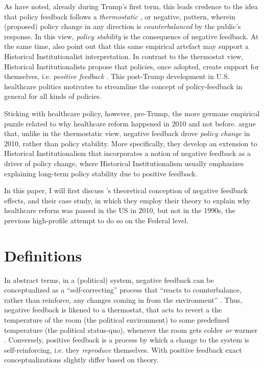 \documentclass[11pt, xcolor=dvipsnames]{article}
\begin{document}
\begin{figure}[H]
    \sffamily
    
\end{figure}


\noindent As \textcite[][]{Busemeyer2019} have noted, already during Trump's first term, this leads credence to the idea that policy feedback follows a \textit{thermostatic} \parencite[][]{Wlezien1995}, or negative, pattern, wherein (proposed) policy change in any direction is \textit{counterbalanced} by the public's response. In this view, \textit{policy stability} is the consequence of negative feedback. At the same time, \textcite[][]{Busemeyer2019} also point out that this same empirical artefact may support a Historical Institutionalist interpretation. In contrast to the thermostat view, Historical Institutionalists propose that policies, once adopted, create support for themselves, i.e. \textit{positive feedback} \parencites[see e.g.][]{Pierson1993}{Pierson2000}. This post-Trump development in U.S. healthcare politics motivates \textcite[][]{Βusemeyer2019} to streamline the concept of policy-feedback in general for all kinds of policies.

Sticking with healthcare policy, however, pre-Trump, the more germane empirical puzzle related to why healthcare reform happened in 2010 and not before. \textcite[][]{Jacobs2014} argue that, unlike in the thermostatic view, negative feedback drove \textit{policy change} in 2010, rather than policy stability. More specifically, they develop an extension to Historical Institutionalism that incorporates a notion of negative feedback as a driver of policy change, where Historical Institutionalism usually emphasizes explaining long-term policy stability due to positive feedback. 

In this paper, I will first discuss \citeauthor[][]{Jacobs2014}'s \citeyear{Jacobs2014} theoretical conception of negative feedback effects, and their case study, in which they employ their theory to explain why healthcare reform was passed in the US in 2010, but not in the 1990s, the previous high-profile attempt to do so on the Federal level.


\section*{Definitions}

In abstract terms, in a (political) system, negative feedback can be conceptualized as a \enquote{self-correcting} \parencite[][p. 8]{Baumgartner2002} process that \enquote{reacts to counterbalance, rather than reinforce, any changes coming in from the environment} . Thus, negative feedback is likened to a thermostat, that acts to revert a the temperature of the room (the political environment) to some predefined temperature (the political status-quo), whenever the room gets colder \textit{or} warmer \parencite[][]{Wlezien1995}. Conversely, positive feedback is a process by which a change to the system is self-reinforcing, i.e. they \textit{reproduce} themselves. With positive feedback exact conceptualizations slightly differ based on theory.
\end{document}
